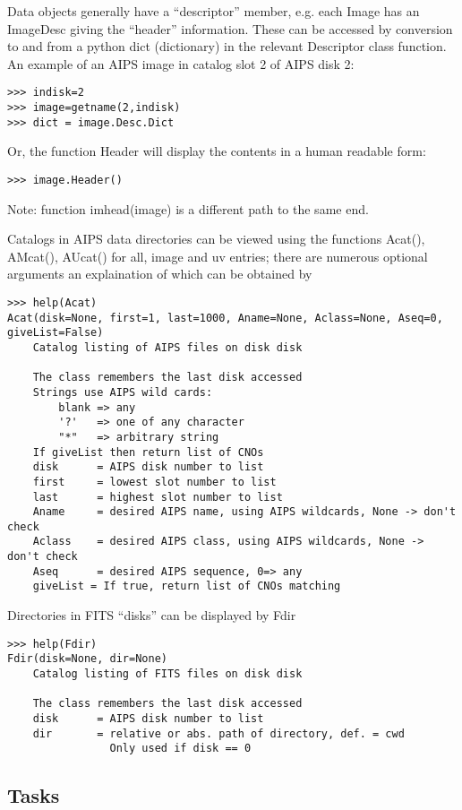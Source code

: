 \documentclass[11pt]{report}
\begin{document}
   Data objects generally have a ``descriptor'' member, e.g. each
Image has an ImageDesc giving the ``header'' information.
These can be accessed by conversion to and from a python dict
(dictionary) in the relevant Descriptor class function.
An example of an AIPS image in catalog slot 2 of AIPS disk 2:
\begin{verbatim}
>>> indisk=2
>>> image=getname(2,indisk)
>>> dict = image.Desc.Dict
\end{verbatim}
Or, the function Header will display the contents in a human readable
form:
\begin{verbatim}
>>> image.Header()
\end{verbatim}
Note: function imhead(image) is a different path to the same end.

Catalogs in AIPS data directories can be viewed using the functions
Acat(), AMcat(), AUcat() for all, image and uv entries; there are
numerous optional arguments an explaination of which can be obtained
by
\begin{verbatim}
>>> help(Acat)
Acat(disk=None, first=1, last=1000, Aname=None, Aclass=None, Aseq=0, giveList=False)
    Catalog listing of AIPS files on disk disk
    
    The class remembers the last disk accessed
    Strings use AIPS wild cards:
        blank => any
        '?'   => one of any character
        "*"   => arbitrary string
    If giveList then return list of CNOs
    disk      = AIPS disk number to list
    first     = lowest slot number to list
    last      = highest slot number to list
    Aname     = desired AIPS name, using AIPS wildcards, None -> don't check
    Aclass    = desired AIPS class, using AIPS wildcards, None -> don't check
    Aseq      = desired AIPS sequence, 0=> any
    giveList = If true, return list of CNOs matching
\end{verbatim}

Directories in FITS ``disks'' can be displayed by Fdir
\begin{verbatim}
>>> help(Fdir)
Fdir(disk=None, dir=None)
    Catalog listing of FITS files on disk disk
    
    The class remembers the last disk accessed
    disk      = AIPS disk number to list
    dir       = relative or abs. path of directory, def. = cwd
                Only used if disk == 0

\end{verbatim}


\subsection{Tasks}
\end{document}
